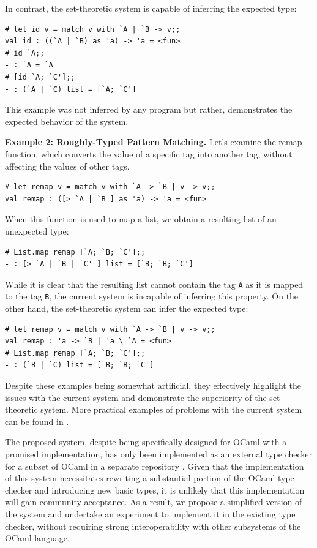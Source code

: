 \documentclass[a4paper,11pt,oneside]{article}
\theoremstyle{definition}
\begin{document}
In contrast, the set-theoretic system is capable of inferring the expected type:

{\ttfamily\begin{verbatim}
# let id v = match v with `A | `B -> v;;
val id : ((`A | `B) as 'a) -> 'a = <fun>
# id `A;;
- : `A = `A
# [id `A; `C'];;
- : (`A | `C) list = [`A; `C']
\end{verbatim}}

This example was not inferred by any program but rather, demonstrates the expected behavior of the system.

\textbf{Example 2: Roughly-Typed Pattern Matching.} Let's examine the remap function, which converts the value of a specific tag into another tag, without affecting the values of other tags.

  {\ttfamily\begin{verbatim}
# let remap v = match v with `A -> `B | v -> v;;
val remap : ([> `A | `B ] as 'a) -> 'a = <fun>
\end{verbatim}}

When this function is used to map a list, we obtain a resulting list of an unexpected type:

{\ttfamily\begin{verbatim}
# List.map remap [`A; `B; `C'];;
- : [> `A | `B | `C' ] list = [`B; `B; `C']
\end{verbatim}}

While it is clear that the resulting list cannot contain the tag \texttt{A} as it is mapped to the tag \texttt{B}, the current system is incapable of inferring this property. On the other hand, the set-theoretic system can infer the expected type:

{\ttfamily\begin{verbatim}
# let remap v = match v with `A -> `B | v -> v;;
val remap : 'a -> `B | 'a \ `A = <fun>
# List.map remap [`A; `B; `C'];;
- : (`B | `C) list = [`B; `B; `C']
\end{verbatim}}

Despite these examples being somewhat artificial, they effectively highlight the issues with the current system and demonstrate the superiority of the set-theoretic system. More practical examples of problems with the current system can be found in \cite{CAML_LIST_1}\cite{CAML_LIST_2}\cite{CAML_LIST_3}\cite{CAML_LIST_4}.

The proposed system, despite being specifically designed for OCaml with a promised implementation, has only been implemented as an external type checker for a subset of OCaml in a separate repository \cite{setvariants}. Given that the implementation of this system necessitates rewriting a substantial portion of the OCaml type checker and introducing new basic types, it is unlikely that this implementation will gain community acceptance. As a result, we propose a simplified version of the system and undertake an experiment to implement it in the existing type checker, without requiring strong interoperability with other subsystems of the OCaml language.
\end{document}
